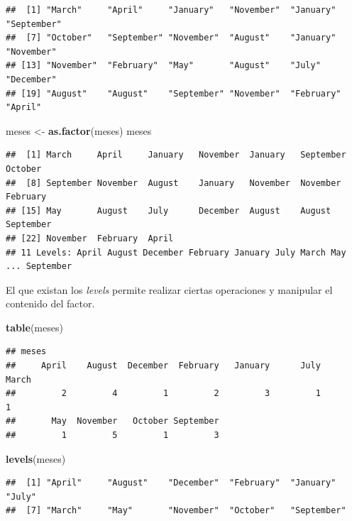 \documentclass[
]{book}
\newenvironment{Shaded}{\begin{snugshade}}{\end{snugshade}}
\newcommand{\FunctionTok}[1]{\textcolor[rgb]{0.13,0.29,0.53}{\textbf{#1}}}
\newcommand{\NormalTok}[1]{#1}
\newcommand{\OtherTok}[1]{\textcolor[rgb]{0.56,0.35,0.01}{#1}}
\begin{document}
\begin{verbatim}
##  [1] "March"     "April"     "January"   "November"  "January"   "September"
##  [7] "October"   "September" "November"  "August"    "January"   "November" 
## [13] "November"  "February"  "May"       "August"    "July"      "December" 
## [19] "August"    "August"    "September" "November"  "February"  "April"
\end{verbatim}

\begin{Shaded}
\begin{Highlighting}[]
\NormalTok{meses }\OtherTok{\textless{}{-}} \FunctionTok{as.factor}\NormalTok{(meses)}
\NormalTok{meses}
\end{Highlighting}
\end{Shaded}

\begin{verbatim}
##  [1] March     April     January   November  January   September October  
##  [8] September November  August    January   November  November  February 
## [15] May       August    July      December  August    August    September
## [22] November  February  April    
## 11 Levels: April August December February January July March May ... September
\end{verbatim}

El que existan los \emph{levels} permite realizar ciertas operaciones y manipular el contenido del factor.

\begin{Shaded}
\begin{Highlighting}[]
\FunctionTok{table}\NormalTok{(meses)}
\end{Highlighting}
\end{Shaded}

\begin{verbatim}
## meses
##     April    August  December  February   January      July     March 
##         2         4         1         2         3         1         1 
##       May  November   October September 
##         1         5         1         3
\end{verbatim}

\begin{Shaded}
\begin{Highlighting}[]
\FunctionTok{levels}\NormalTok{(meses)}
\end{Highlighting}
\end{Shaded}

\begin{verbatim}
##  [1] "April"     "August"    "December"  "February"  "January"   "July"     
##  [7] "March"     "May"       "November"  "October"   "September"
\end{verbatim}
\end{document}
